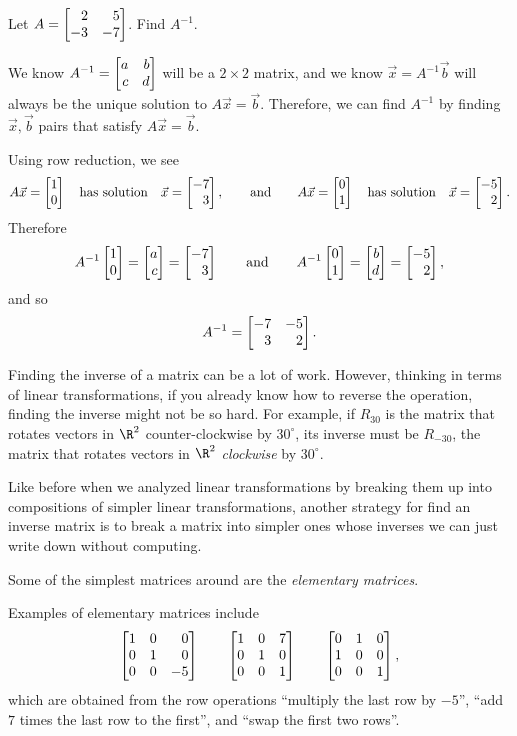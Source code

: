 \begin{example}
	Let $A=\mat{2&5\\-3&-7}$. Find $A^{-1}$.

	We know $A^{-1}=\mat{a&b\\c&d}$ will be a $2\times 2$ matrix, and we know $\vec x=A^{-1}\vec b$ will always
	be the unique solution to $A\vec x=\vec b$. Therefore, we can find $A^{-1}$ by finding $\vec x,\vec b$ pairs that
	satisfy $A\vec x=\vec b$.

	Using row reduction, we see
	\[
		A\vec x=\mat{1\\0}\quad\text{has solution}\quad \vec x=\mat{-7\\3}, 
		\qquad\text{and}
		\qquad
		A\vec x=\mat{0\\1}\quad\text{has solution}\quad \vec x=\mat{-5\\2}.
	\]
	Therefore
	\[
		A^{-1}\mat{1\\0}=\mat{a\\c}=\mat{-7\\3}\qquad \text{and}\qquad
		A^{-1}\mat{0\\1}=\mat{b\\d}=\mat{-5\\2},
	\]
	and so
	\[
		A^{-1}=\mat{-7&-5\\3&2}.
	\]
\end{example}


Finding the inverse of a matrix can be a lot of work. However, thinking in terms of linear transformations,
if you already know how to reverse the operation, finding the inverse might not be so hard. For example, 
if $R_{30}$ is the matrix that rotates vectors in $\R^2$ counter-clockwise by $30^\circ$, its inverse must be
$R_{-30}$, the matrix that rotates vectors in $\R^2$ \emph{clockwise} by $30^\circ$.

Like before when we analyzed linear transformations by breaking them up into compositions
of simpler linear transformations, another strategy for find an inverse matrix is to break a matrix
into simpler ones whose inverses we can just write down without computing.

Some of the simplest matrices around are the \emph{elementary matrices}.


Examples of elementary matrices include
\[
	\mat{1&0&0\\0&1&0\\0&0&-5}\qquad
	\mat{1&0&7\\0&1&0\\0&0&1}\qquad
	\mat{0&1&0\\1&0&0\\0&0&1},
\]
which are obtained from the row operations ``multiply the last row by $-5$'', ``add $7$ times the last row to the first'',
and ``swap the first two rows''.

